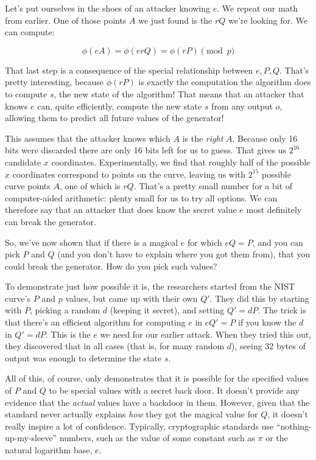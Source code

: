 \documentclass[11pt,ebook,table,dvipsnames]{memoir}
\begin{document}
Let's put ourselves in the shoes of an attacker knowing $e$. We repeat
our math from earlier. One of those points $A$ we just found is the
$rQ$ we're looking for. We can compute:

\[
\phi(eA) = \phi(erQ) = \phi(rP) \pmod p
\]

That last step is a consequence of the special relationship between
$e, P, Q$. That's pretty interesting, because $\phi(rP)$ is exactly
the computation the algorithm does to compute $s$, the new state of
the algorithm! That means that an attacker that knows $e$ can, quite
efficiently, compute the new state $s$ from any output $o$, allowing
them to predict all future values of the generator!

This assumes that the attacker knows which $A$ is the \emph{right} $A$.
Because only 16 bits were discarded there are only 16 bits left for us
to guess. That gives us $2^{16}$ candidate $x$ coordinates.
Experimentally, we find that roughly half of the possible $x$
coordinates correspond to points on the curve, leaving us with
$2^{15}$ possible curve points $A$, one of which is $rQ$. That's a
pretty small number for a bit of computer-aided arithmetic: plenty
small for us to try all options. We can therefore say that an attacker
that does know the secret value $e$ most definitely can break the
generator.

So, we've now shown that if there is a magical $e$ for which $eQ=P$,
and you can pick $P$ and $Q$ (and you don't have to explain where you
got them from), that you could break the generator. How do you pick
such values?

To demonstrate just how possible it is, the researchers started from
the NIST curve's $P$ and $p$ values, but came up with their own $Q'$.
They did this by starting with $P$, picking a random $d$ (keeping it
secret), and setting $Q' = dP$. The trick is that there's an efficient
algorithm for computing $e$ in $eQ' = P$ if you know the $d$ in $Q' =
dP$. This is the $e$ we need for our earlier attack. When they tried
this out, they discovered that in all cases (that is, for many random
$d$), seeing 32 bytes of output was enough to determine the state $s$.

All of this, of course, only demonstrates that it is possible for the
specified values of $P$ and $Q$ to be special values with a secret
back door. It doesn't provide any evidence that the \emph{actual} values
have a backdoor in them. However, given that the standard never
actually explains \emph{how} they got the magical value for $Q$, it doesn't
really inspire a lot of confidence. Typically, cryptographic standards
use \enquote{nothing-up-my-sleeve} numbers, such as the value of some constant
such as $\pi$ or the natural logarithm base, $e$.
\end{document}
